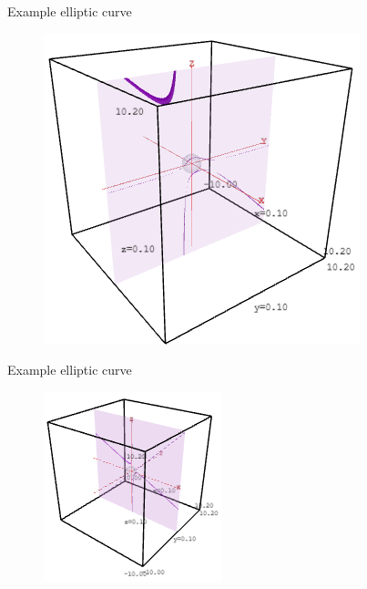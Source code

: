 \documentclass[aspectratio=169,xcolor=dvipsnames]{beamer}
\begin{document}
\begin{frame}{Example elliptic curve}
    \begin{figure}
        \centering
        \href{https://doktor-ziel.github.io/ECC/elliptic-curve-03.html}{\includegraphics[height=0.8\textheight]{elliptic-curve-03.png}}
    \end{figure}
\end{frame}



\begin{frame}{Example elliptic curve}
    \begin{figure}
        \centering
        \href{https://doktor-ziel.github.io/ECC/elliptic-curve-04.html}{\includegraphics[height=0.8\textheight]{elliptic-curve-04.png}}
    \end{figure}
\end{frame}

\end{document}
